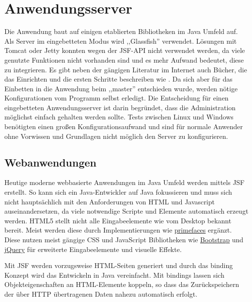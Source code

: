 \documentclass[oneside, ngerman, toc=bibliography,bibliography=totoc,listof=entryprefix, open=right,numbers=noenddot,fontsize=12pt]{scrbook}
\begin{document}
\section{Anwendungsserver}
\label{chap:appserv}
Die Anwendung baut auf einigen etablierten Bibliotheken im Java Umfeld auf. Als Server im eingebetteten Modus wird ,,Glassfish'' verwendet.
Lösungen mit Tomcat oder Jetty konnten wegen der JSF-API nicht verwendet werden, da viele genutzte Funktionen nicht vorhanden sind und es mehr Aufwand bedeutet, diese zu integrieren. Es gibt neben der gängigen Literatur im Internet auch Bücher, die das Einrichten und die ersten Schritte beschreiben wie \cite{glassfishee7}. Da sich aber für das Einbetten in die Anwendung beim ,,master'' entschieden wurde, werden nötige Konfigurationen vom Programm selbst erledigt.
Die Entscheidung für einen eingebetteten Anwendungsserver ist darin begründet, dass die Administration möglichst einfach gehalten werden sollte.
Tests zwischen Linux und Windows benötigten einen großen Konfigurationsaufwand und sind für normale Anwender ohne Vorwissen und Grundlagen nicht möglich den Server zu konfigurieren.


\subsection{Webanwendungen}
Heutige moderne webbasierte Anwendungen im Java Umfeld werden mittels {JSF} erstellt. So kann sich ein Java-Entwickler auf Java fokussieren und muss sich nicht hauptsächlich mit den Anforderungen von HTML und Javascript auseinandersetzen, da viele notwendige Scripte und Elemente automatisch erzeugt werden. HTML5 stellt nicht alle Eingabeelemente wie vom Desktop bekannt bereit. Meist werden diese durch Implementierungen wie \href{http://primefaces.org/}{{primefaces}} ergänzt. Diese nutzen meist gängige {CSS} und {JavaScript} Bibliotheken wie \href{http://getbootstrap.com/}{Bootstrap} und \href{https://jquery.com/}{jQuery} für erweiterte Eingabeelemente und visuelle Effekte.

Mit JSF  werden vorzugsweise HTML-Seiten generiert und durch das { binding} Konzept wird das Entwickeln in Java vereinfacht.
Mit { bindings} lassen sich Objekteigenschaften an HTML-Elemente koppeln, so dass das Zurückspeichern der über HTTP übertragenen Daten nahezu automatisch erfolgt.
\end{document}
